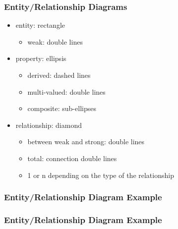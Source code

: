 \documentclass[dvipsnames]{beamer}
\begin{document}
\begin{frame}
  \frametitle{Entity/Relationship Diagrams}

  \begin{itemize}
    \item entity: rectangle
    \begin{itemize}
      \item weak: double lines
    \end{itemize}

    \pause
    \item property: ellipsis
    \begin{itemize}
      \item derived: dashed lines
      \item multi-valued: double lines
      \item composite: sub-ellipses
    \end{itemize}

    \pause
    \item relationship: diamond
    \begin{itemize}
      \item between weak and strong: double lines
      \item total: connection double lines
      \item 1 or n depending on the type of the relationship
    \end{itemize}
 \end{itemize}
\end{frame}

\begin{frame}
  \frametitle{Entity/Relationship Diagram Example}

  \begin{center}
  \end{center}
\end{frame}

\begin{frame}
  \frametitle{Entity/Relationship Diagram Example}

  \begin{center}
  \end{center}
\end{frame}
\end{document}
